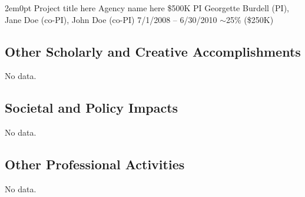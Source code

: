 \documentclass[11pt]{article}
\begin{document}
\begin{adjustwidth}{2em}{0pt}
\grantentry
    {Project title here}
    {Agency name here}
    {\$500K}
    {PI}
    {Georgette Burdell (PI), Jane Doe (co-PI), John Doe (co-PI)}
    {7/1/2008 -- 6/30/2010}
    {$\sim$25\% (\$250K)}

\subsection{Other Scholarly and Creative Accomplishments}


No data.

\subsection{Societal and Policy Impacts}


No data.

\subsection{Other Professional Activities}

No data.

\end{adjustwidth}
\end{document}
